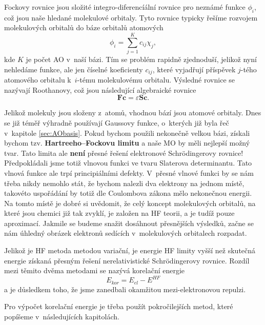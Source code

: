 Fockovy rovnice jsou složité integro-diferencíální rovnice pro neznámé funkce $\phi_i$,
což jsou naše hledané molekulové orbitaly.
Tyto rovnice typicky řešíme rozvojem molekulových orbitalů do báze orbitalů atomových
\begin{equation}
\phi_i=\sum_{j=1}^K c_{ij} \chi_j ,
\end{equation}
kde $K$ je počet AO v~naší bázi. Tím se problém rapidně zjednoduší, jelikož nyní nehledáme funkce, ale jen číselné koeficienty $c_{ij}$, které vyjadřují příspěvek $j$-tého atomového orbitalu k~$i$-tému molekulovému orbitalu.
Výsledné rovnice se nazývají Roothanovy, což jsou následující algebraické rovnice
\begin{equation}
\mathbf{F} \mathbf{c} = \varepsilon \mathbf{S} \mathbf{c} .
\end{equation}

Jelikož molekuly jsou složeny z~atomů, vhodnou bází jsou atomové orbitaly.
Dnes se již téměř výhradně používají Gaussovy funkce, o~kterých již byla řeč v~kapitole \ref{sec:AObasis}.
Pokud bychom použili nekonečně velkou bázi, získali bychom tzv. \textbf{Hartreeho--Fockovu limitu} a naše MO by měli nejlepší možný tvar. Tato limita ale \textbf{není} přesné řešení elektronové Schr\"{o}dingerovy rovnice!
Předpokládali jsme totiž vlnovou funkci ve tvaru Slaterova determinantu. Tato vlnová funkce ale trpí principiálními defekty. V~přesné vlnové funkci by se nám třeba nikdy nemohlo stát, že bychom nalezli dva elektrony na jednom místě, takovéto uspořádání by totiž dle Coulombova zákona mělo nekonečnou energii.
Na tomto místě je dobré si uvědomit, že celý koncept molekulových orbitalů, na které jsou chemici již tak zvyklí, je založen na HF teorii, a je tudíž pouze aproximací. Jakmile se budeme snažit dosáhnout přesnějších výsledků, začne se nám úhledný obrázek elektronů sedících v~molekulových orbitalech rozpadat.

Jelikož je HF metoda metodou variační, je energie HF limity vyšší než skutečná energie získaná přesným řešení nerelativistické Schr\"{o}dingerovy rovnice.
Rozdíl mezi těmito dvěma metodami se nazývá korelační energie
\begin{equation}
E_{kor}=E_{el} - E^{HF}
\end{equation}
a je důsledkem toho, že jsme zanedbali okamžitou mezi-elektronovou repulzi.


Pro výpočet korelační energie je třeba použít pokročilejších metod, které popíšeme v~následujících kapitolách.

